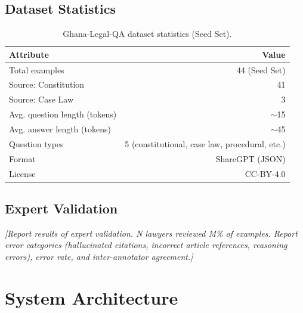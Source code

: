 \documentclass[11pt]{article}
\begin{document}
\subsection{Dataset Statistics}

\begin{table}[t]
\centering
\small
\begin{tabular}{lr}
\toprule
\textbf{Attribute} & \textbf{Value} \\
\midrule
Total examples & 44 (Seed Set) \\
Source: Constitution & 41 \\
Source: Case Law & 3 \\
Avg. question length (tokens) & $\sim$15 \\
Avg. answer length (tokens) & $\sim$45 \\
Question types & 5 (constitutional, case law, procedural, etc.) \\
Format & ShareGPT (JSON) \\
License & CC-BY-4.0 \\
\bottomrule
\end{tabular}
\caption{Ghana-Legal-QA dataset statistics (Seed Set).}
\label{tab:dataset-stats}
\end{table}

\subsection{Expert Validation}


\textit{[Report results of expert validation. N lawyers reviewed M\%
of examples. Report error categories (hallucinated citations, incorrect
article references, reasoning errors), error rate, and inter-annotator
agreement.]}


\section{System Architecture}
\label{sec:architecture}
\end{document}
